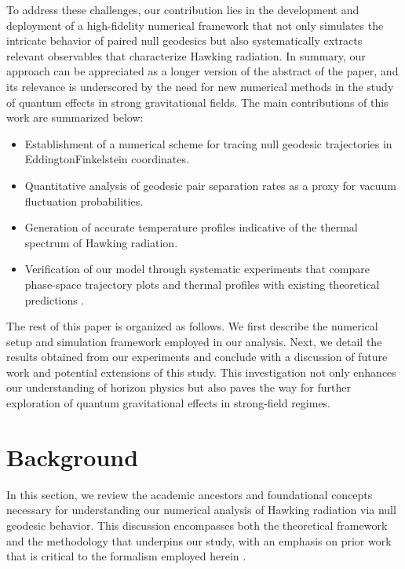\documentclass{article}\usepackage[utf8]{inputenc} %
\begin{document}
To address these challenges, our contribution lies in the development and deployment of a high-fidelity numerical framework that not only simulates the intricate behavior of paired null geodesics but also systematically extracts relevant observables that characterize Hawking radiation. In summary, our approach can be appreciated as a longer version of the abstract of the paper, and its relevance is underscored by the need for new numerical methods in the study of quantum effects in strong gravitational fields. The main contributions of this work are summarized below:
\begin{itemize}
    \item Establishment of a numerical scheme for tracing null geodesic trajectories in Eddington\textendash Finkelstein coordinates.
    \item Quantitative analysis of geodesic pair separation rates as a proxy for vacuum fluctuation probabilities.
    \item Generation of accurate temperature profiles indicative of the thermal spectrum of Hawking radiation.
    \item Verification of our model through systematic experiments that compare phase-space trajectory plots and thermal profiles with existing theoretical predictions \cite{Unruh1976}.
\end{itemize}

The rest of this paper is organized as follows. We first describe the numerical setup and simulation framework employed in our analysis. Next, we detail the results obtained from our experiments and conclude with a discussion of future work and potential extensions of this study. This investigation not only enhances our understanding of horizon physics but also paves the way for further exploration of quantum gravitational effects in strong-field regimes.

\section{Background}
In this section, we review the academic ancestors and foundational concepts necessary for understanding our numerical analysis of Hawking radiation via null geodesic behavior. This discussion encompasses both the theoretical framework and the methodology that underpins our study, with an emphasis on prior work that is critical to the formalism employed herein \cite{Hawking1975,Jacobson1993,Unruh1976}.
\end{document}
